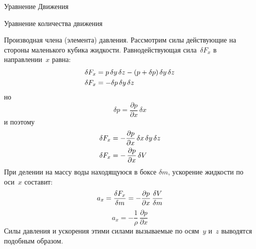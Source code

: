 \begin{chapter}{Уравнение Движения}
\begin{section}{Уравнение количества движения}
\begin{paragraph}{Производная члена (элемента) давления.}
Рассмотрим силы действующие на стороны маленького кубика
жидкости. Равнодействующая сила~$\delta F_x$ в направлении~$x$ равна:
\begin{align}
\delta F_x &= p\,\delta{y}\,\delta{z} - (p + \delta{p})\,\delta{y}\,\delta{z}
\notag \\
\delta F_x &= - \delta{p}\,\delta{y}\,\delta{z} \notag
\end{align}
но
\begin{displaymath}
\delta{p} = \frac{\partial{p}}{\partial{x}}\,\delta{x}
\end{displaymath}
и поэтому
\begin{align}
\delta F_x &= - \frac{\partial{p}}{\partial{x}}\,\delta{x}\,\delta{y}\,\delta{z}
\notag \\
\delta F_x &=-\,\frac{\partial{p}}{\partial{x}}\, \delta{V} \notag
\end{align}
При делении на массу воды находящуюся в боксе $\delta m$, ускорение
жидкости по оси~$x$ составит:
\begin{equation}
a_x = \frac{{\delta F_x}}{\delta{m}} = - \frac{\partial{p}}{\partial{x}}\,
\frac{\delta{V}}{\delta{m}} \notag
\end{equation}
\begin{equation}
\boxed{a_x = - \frac{1}{\rho}\,\frac{\partial{p}}{\partial{x}}}
\end{equation}
Силы давления и ускорения этими силами вызываемые по осям~$y$ и~$z$
выводятся подобным образом.
%

\end{paragraph}
\end{section}
\end{chapter}

